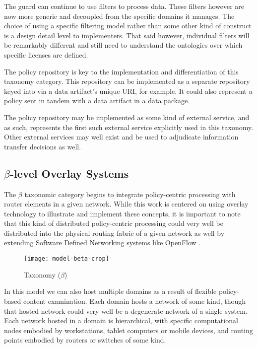 The guard can continue to use filters to process data.  These filters however are now more generic and decoupled from the specific domains it manages.  The choice of using a specific filtering model rather than some other kind of construct is a design detail level to implementers.  That said however, individual filters will be remarkably different and still need to understand the ontologies over which specific licenses are defined.

The policy repository is key to the implementation and differentiation of this taxonomy category.  This repository can be implemented as a separate repository keyed into via a data artifact's unique URI, for example.  It could also represent a policy sent in tandem with a data artifact in a data package.

The policy repository may be implemented as some kind of external service, and as such, represents the first such external service explicitly used in this taxonomy.  Other external services may well exist and be used to adjudicate information transfer decisions as well.

\subsection{$\beta$-level Overlay Systems}
The $\beta$ taxonomic category begins to integrate policy-centric processing with router elements in a given network.  While this work is centered on using overlay technology to illustrate and implement these concepts, it is important to note that this kind of distributed policy-centric processing could very well be distributed into the physical routing fabric of a given network as well by extending Software Defined Networking systems like OpenFlow \cite{proposal:openflow}.

\begin{figure}[!t]
\centering
\texttt{[image: model-beta-crop]}
\caption{Taxonomy ($\beta$)}
\label{fig:model:taxonomy-beta}
\end{figure}

In this model we can also host multiple domains as a result of flexible policy-based content examination.  Each domain hosts a network of some kind, though that hosted network could very well be a degenerate network of a single system.  Each network hosted in a domain is hierarchical, with specific computational nodes embodied by workstations, tablet computers or mobile devices, and routing points embodied by routers or switches of some kind.

